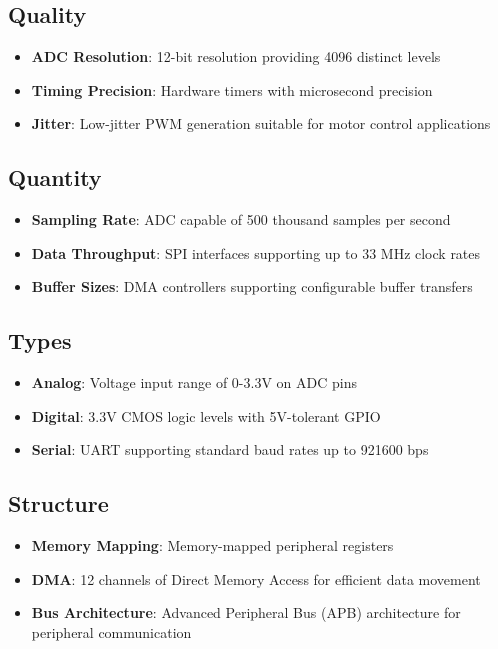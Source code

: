 \subsection{Quality}
\begin{itemize}
    \item \textbf{ADC Resolution}: 12-bit resolution providing 4096 distinct levels \cite{RaspberryPiRP2040:2024}
    \item \textbf{Timing Precision}: Hardware timers with microsecond precision \cite{RaspberryPiRP2040:2024}
    \item \textbf{Jitter}: Low-jitter PWM generation suitable for motor control applications \cite{Schneider:2023}
\end{itemize}

\subsection{Quantity}
\begin{itemize}
    \item \textbf{Sampling Rate}: ADC capable of 500 thousand samples per second \cite{RaspberryPiRP2040:2024}
    \item \textbf{Data Throughput}: SPI interfaces supporting up to 33 MHz clock rates \cite{RaspberryPiRP2040:2024}
    \item \textbf{Buffer Sizes}: DMA controllers supporting configurable buffer transfers \cite{RaspberryPiRP2040:2024}
\end{itemize}

\subsection{Types}
\begin{itemize}
    \item \textbf{Analog}: Voltage input range of 0-3.3V on ADC pins \cite{RaspberryPiRP2040:2024}
    \item \textbf{Digital}: 3.3V CMOS logic levels with 5V-tolerant GPIO \cite{RaspberryPiRP2040:2024}
    \item \textbf{Serial}: UART supporting standard baud rates up to 921600 bps \cite{RaspberryPiRP2040:2024}
\end{itemize}

\subsection{Structure}
\begin{itemize}
    \item \textbf{Memory Mapping}: Memory-mapped peripheral registers \cite{RaspberryPiRP2040:2024}
    \item \textbf{DMA}: 12 channels of Direct Memory Access for efficient data movement \cite{RaspberryPiRP2040:2024}
    \item \textbf{Bus Architecture}: Advanced Peripheral Bus (APB) architecture for peripheral communication \cite{RaspberryPiRP2040:2024}
\end{itemize}

